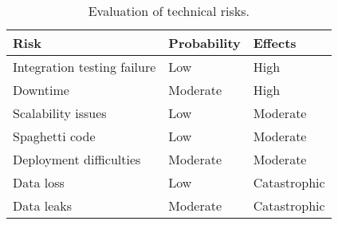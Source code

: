 \begin{table}[p]
\centering
    \begin{tabular}{| l | l | l |}
        \hline
        \textbf{Risk}                   & \textbf{Probability}  & \textbf{Effects}  \\
        \hline
        Integration testing failure     & Low                   & High              \\
        \hline
        Downtime                        & Moderate              & High              \\
        \hline
        Scalability issues              & Low                   & Moderate          \\
        \hline
        Spaghetti code                  & Low                   & Moderate          \\
        \hline
        Deployment difficulties         & Moderate              & Moderate          \\
        \hline
        Data loss                       & Low                   & Catastrophic      \\
        \hline
        Data leaks                      & Moderate              & Catastrophic      \\
        \hline
    \end{tabular}
    \caption{Evaluation of technical risks.}
    \label{tab:technical-risks}
\end{table}